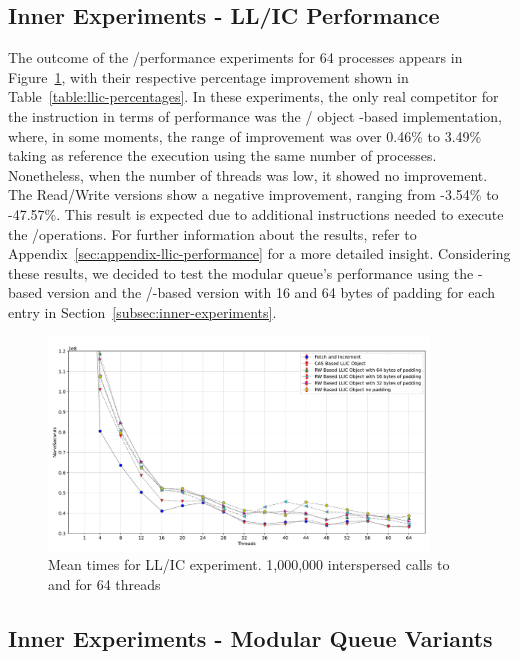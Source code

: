 \subsection{Inner Experiments - LL/IC Performance}

The outcome of the \LL/\IC performance experiments for 64 processes appears in Figure~\ref{fig:llic-times}, with their respective percentage improvement shown in Table~\ref{table:llic-percentages}. In these experiments, the only real competitor for the \FAI instruction in terms of performance was the \LL/\IC{} object \CAS-based implementation, where, in some moments, the range of improvement was over 0.46\% to 3.49\% taking as reference the execution using the same number of processes. Nonetheless, when the number of threads was low, it showed no improvement. The Read/Write versions show a negative improvement, ranging from -3.54\% to -47.57\%. This result is expected due to additional instructions needed to execute the \LL/\IC operations. For further information about the results, refer to Appendix~\ref{sec:appendix-llic-performance} for a more detailed insight. Considering these results, we decided to test the modular queue's performance using the \CAS-based version and the \R/\W-based version with 16 and 64 bytes of padding for each entry in Section~\ref{subsec:inner-experiments}.

\begin{figure}[ht!]
  \centering
  \includegraphics[width=0.9\textwidth]{contents/figures/V_llic_64_insert_extract.pdf}
  \caption{\label{fig:llic-times} Mean times for LL/IC experiment. 1,000,000 interspersed calls to \Take and \Put for 64 threads}
\end{figure}


% 

\subsection{\label{subsec:inner-experiments}Inner Experiments - Modular Queue Variants}


